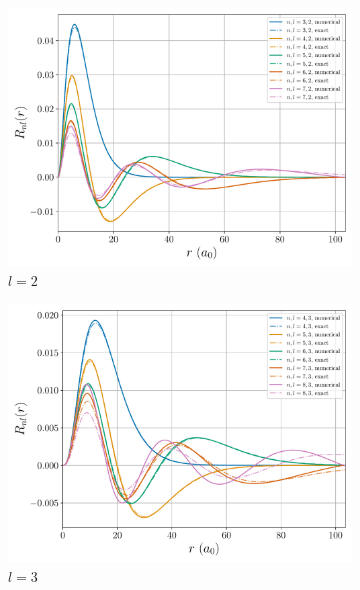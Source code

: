 \documentclass[a4paper,DIV=12,english]{scrartcl}
\begin{document}
\begin{figure}
\begin{subfigure}{0.49\textwidth}
        \centering
        \includegraphics[width=\textwidth]{../plots/psis_comp/l2.pdf}
        \caption{$l=2$}
        \label{subfig:l2}
    \end{subfigure}
    \begin{subfigure}{0.49\textwidth}
        \centering
        \includegraphics[width=\textwidth]{../plots/psis_comp/l3.pdf}
        \caption{$l=3$}
        \label{subfig:l3}
    \end{subfigure}\\
    \begin{subfigure}{0.49\textwidth}
        \centering

\end{subfigure}
\end{figure}
\end{document}
